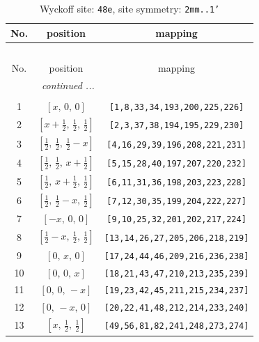 \documentclass[fleqn,8pt]{jsarticle}
\begin{document}
\begin{longtable}{ccc}
\caption{Wyckoff site: {\tt 48e}, site symmetry: {\tt 2mm..1'}}
 \\
 \hline \hline
No. & position & mapping \\ \hline \endfirsthead

\multicolumn{2}{l}{\tablename\ \thetable{}} \\
 \hline \hline
No. & position & mapping \\ \hline \endhead

 \hline \hline
\multicolumn{2}{r}{\footnotesize\it continued ...} \\ \endfoot

 \hline \hline
\multicolumn{2}{r}{} \\ \endlastfoot

1 & $\left[ x,\, 0,\, 0 \right]$ & {\tt [1,8,33,34,193,200,225,226]} \\ \hline
2 & $\left[ x + \frac{1}{2},\, \frac{1}{2},\, \frac{1}{2} \right]$ & {\tt [2,3,37,38,194,195,229,230]} \\ \hline
3 & $\left[ \frac{1}{2},\, \frac{1}{2},\, \frac{1}{2} - x \right]$ & {\tt [4,16,29,39,196,208,221,231]} \\ \hline
4 & $\left[ \frac{1}{2},\, \frac{1}{2},\, x + \frac{1}{2} \right]$ & {\tt [5,15,28,40,197,207,220,232]} \\ \hline
5 & $\left[ \frac{1}{2},\, x + \frac{1}{2},\, \frac{1}{2} \right]$ & {\tt [6,11,31,36,198,203,223,228]} \\ \hline
6 & $\left[ \frac{1}{2},\, \frac{1}{2} - x,\, \frac{1}{2} \right]$ & {\tt [7,12,30,35,199,204,222,227]} \\ \hline
7 & $\left[ - x,\, 0,\, 0 \right]$ & {\tt [9,10,25,32,201,202,217,224]} \\ \hline
8 & $\left[ \frac{1}{2} - x,\, \frac{1}{2},\, \frac{1}{2} \right]$ & {\tt [13,14,26,27,205,206,218,219]} \\ \hline
9 & $\left[ 0,\, x,\, 0 \right]$ & {\tt [17,24,44,46,209,216,236,238]} \\ \hline
10 & $\left[ 0,\, 0,\, x \right]$ & {\tt [18,21,43,47,210,213,235,239]} \\ \hline
11 & $\left[ 0,\, 0,\, - x \right]$ & {\tt [19,23,42,45,211,215,234,237]} \\ \hline
12 & $\left[ 0,\, - x,\, 0 \right]$ & {\tt [20,22,41,48,212,214,233,240]} \\ \hline
13 & $\left[ x,\, \frac{1}{2},\, \frac{1}{2} \right]$ & {\tt [49,56,81,82,241,248,273,274]} \\ \hline

\end{longtable}
\end{document}
